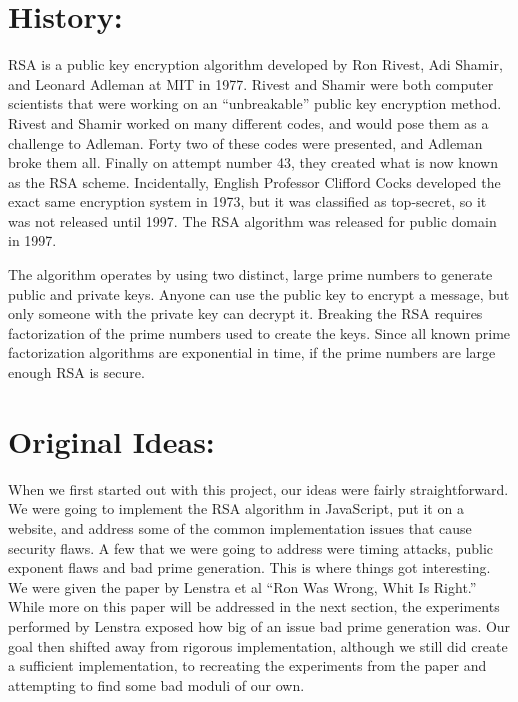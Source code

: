 \documentclass[11pt,twoside]{article}
\begin{document}
\begin{multicols}{2}
\section{History:}
\lettrine[nindent=0em,lines=3]{R} SA is a public key encryption algorithm 
developed by Ron Rivest, Adi Shamir, 
and Leonard Adleman at MIT in 1977. Rivest and Shamir were both computer
scientists that were working on an ``unbreakable'' public key encryption method.
Rivest and Shamir worked on many different codes, and would pose them as a
challenge to Adleman. Forty two of these codes were presented, and Adleman broke
them all. Finally on attempt number 43, they created what is now known as the
RSA scheme. Incidentally, English Professor Clifford Cocks developed the exact
same encryption system in 1973, but it was classified as top-secret, so it was
not released until 1997. The RSA algorithm was released for public domain in
1997.

The algorithm operates by using two distinct, large prime numbers to generate
public and private keys. Anyone can use the public key to encrypt a message, but
only someone with the private key can decrypt it. Breaking the RSA requires
factorization of the prime numbers used to create the keys. Since all known
prime factorization algorithms are exponential in time, if the prime numbers
are large enough RSA is secure.

\section{Original Ideas:}
When we first started out with this project, our ideas were fairly
straightforward. We were going to implement the RSA algorithm in JavaScript, put
it on a website, and address some of the common implementation issues that cause
security flaws. A few that we were going to address were timing attacks, public
exponent flaws and bad prime generation. This is where things got interesting.
We were given the paper by Lenstra et al ``Ron Was Wrong, Whit Is Right.'' While
more on this paper will be addressed in the next section, the experiments
performed by Lenstra exposed how big of an issue bad prime generation was. Our
goal then shifted away from rigorous implementation, although we still did
create a sufficient implementation, to recreating the experiments from the paper
and attempting to find some bad moduli of our own.


\end{multicols}
\end{document}
